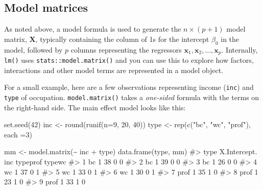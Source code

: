 \documentclass[
  letterpaper,
  10pt,
  krantz2]{krantz}
\makeatletter
\newenvironment{Shaded}{\begin{snugshade}}{\end{snugshade}}
\newcommand{\AttributeTok}[1]{\textcolor[rgb]{0.40,0.45,0.13}{#1}}
\newcommand{\CommentTok}[1]{\textcolor[rgb]{0.37,0.37,0.37}{#1}}
\newcommand{\DecValTok}[1]{\textcolor[rgb]{0.68,0.00,0.00}{#1}}
\newcommand{\FunctionTok}[1]{\textcolor[rgb]{0.28,0.35,0.67}{#1}}
\newcommand{\NormalTok}[1]{\textcolor[rgb]{0.00,0.23,0.31}{#1}}
\newcommand{\OtherTok}[1]{\textcolor[rgb]{0.00,0.23,0.31}{#1}}
\newcommand{\SpecialCharTok}[1]{\textcolor[rgb]{0.37,0.37,0.37}{#1}}
\newcommand{\StringTok}[1]{\textcolor[rgb]{0.13,0.47,0.30}{#1}}
\newenvironment{kframe}{%
  \medskip{}
  \setlength{\fboxsep}{.8em}
  \def\at@end@of@kframe{}%
  \ifinner\ifhmode%
  \def\at@end@of@kframe{\end{minipage}}%
  \begin{minipage}{\columnwidth}%
  \fi\fi%
  \def\FrameCommand##1{\hskip\@totalleftmargin \hskip-\fboxsep
  \colorbox{shadecolor}{##1}\hskip-\fboxsep
      \hskip-\linewidth \hskip-\@totalleftmargin \hskip\columnwidth}%
  \MakeFramed {\advance\hsize-\width
    \@totalleftmargin\z@ \linewidth\hsize
    \@setminipage}}%
{\par\unskip\endMakeFramed%
  \at@end@of@kframe}
\renewenvironment{Shaded}{\begin{kframe}}{\end{kframe}}
\makeatother
\begin{document}
\subsection{Model matrices}\label{model-matrices}

As noted above, a model formula is used to generate the
\(n \times (p+1)\) model matrix, \(\mathbf{X}\), typically containing
the column of 1s for the intercept \(\beta_0\) in the model, followed by
\(p\) columns representing the regressors
\(\mathbf{x}_1, \mathbf{x}_2, \dots , \mathbf{x}_p\). Internally,
\texttt{lm()} uses \texttt{stats::model.matrix()} and you can use this
to explore how factors, interactions and other model terms are
represented in a model object.

For a small example, here are a few observations representing income
(\texttt{inc}) and \texttt{type} of occupation. \texttt{model.matrix()}
takes a \emph{one-sided} formula with the terms on the right-hand side.
The main effect model looks like this:

\begin{Shaded}
\begin{Highlighting}[]
\FunctionTok{set.seed}\NormalTok{(}\DecValTok{42}\NormalTok{)}
\NormalTok{inc }\OtherTok{\textless{}{-}} \FunctionTok{round}\NormalTok{(}\FunctionTok{runif}\NormalTok{(}\AttributeTok{n=}\DecValTok{9}\NormalTok{, }\DecValTok{20}\NormalTok{, }\DecValTok{40}\NormalTok{))}
\NormalTok{type }\OtherTok{\textless{}{-}} \FunctionTok{rep}\NormalTok{(}\FunctionTok{c}\NormalTok{(}\StringTok{"bc"}\NormalTok{, }\StringTok{"wc"}\NormalTok{, }\StringTok{"prof"}\NormalTok{), }\AttributeTok{each =}\DecValTok{3}\NormalTok{)}

\NormalTok{mm }\OtherTok{\textless{}{-}} \FunctionTok{model.matrix}\NormalTok{(}\SpecialCharTok{\textasciitilde{}}\NormalTok{ inc }\SpecialCharTok{+}\NormalTok{ type) }
\FunctionTok{data.frame}\NormalTok{(type, mm)}
\CommentTok{\#\textgreater{}   type X.Intercept. inc typeprof typewc}
\CommentTok{\#\textgreater{} 1   bc            1  38        0      0}
\CommentTok{\#\textgreater{} 2   bc            1  39        0      0}
\CommentTok{\#\textgreater{} 3   bc            1  26        0      0}
\CommentTok{\#\textgreater{} 4   wc            1  37        0      1}
\CommentTok{\#\textgreater{} 5   wc            1  33        0      1}
\CommentTok{\#\textgreater{} 6   wc            1  30        0      1}
\CommentTok{\#\textgreater{} 7 prof            1  35        1      0}
\CommentTok{\#\textgreater{} 8 prof            1  23        1      0}
\CommentTok{\#\textgreater{} 9 prof            1  33        1      0}
\end{Highlighting}
\end{Shaded}
\end{document}
